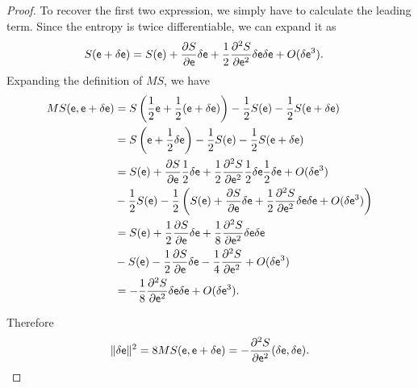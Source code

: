 \begin{proof}
	To recover the first two expression, we simply have to calculate the leading term. Since the entropy is twice differentiable, we can expand it as
\begin{equation}
	\begin{aligned}
		S(\mathsf{e} + \delta \mathsf{e}) &= S(\mathsf{e}) + \frac{\partial S}{\partial \mathsf{e}} \delta \mathsf{e} + \frac{1}{2} \frac{\partial^2 S}{\partial \mathsf{e}^2} \delta \mathsf{e} \delta \mathsf{e} + O(\delta \mathsf{e} ^3).
	\end{aligned}
\end{equation}
Expanding the definition of $MS$, we have
\begin{equation}
	\begin{aligned}
		MS(\mathsf{e}, \mathsf{e} + \delta \mathsf{e}) &= S\left(\frac{1}{2} \mathsf{e} + \frac{1}{2}(\mathsf{e} + \delta \mathsf{e}) \right) - \frac{1}{2} S(\mathsf{e}) - \frac{1}{2} S(\mathsf{e}+\delta \mathsf{e}) \\
		&=  S\left(\mathsf{e} + \frac{1}{2} \delta \mathsf{e} \right) - \frac{1}{2} S(\mathsf{e}) - \frac{1}{2} S(\mathsf{e}+\delta \mathsf{e}) \\
		&= S(\mathsf{e}) + \frac{\partial S}{\partial \mathsf{e}} \frac{1}{2}\delta \mathsf{e} + \frac{1}{2} \frac{\partial^2 S}{\partial \mathsf{e}^2} \frac{1}{2}\delta \mathsf{e} \frac{1}{2}\delta \mathsf{e} + O(\delta \mathsf{e} ^3) \\
		&- \frac{1}{2} S(\mathsf{e}) - \frac{1}{2} \left( S(\mathsf{e}) + \frac{\partial S}{\partial \mathsf{e}} \delta \mathsf{e} + \frac{1}{2} \frac{\partial^2 S}{\partial \mathsf{e}^2} \delta \mathsf{e} \delta \mathsf{e} + O(\delta \mathsf{e} ^3) \right) \\
		&= S(\mathsf{e}) + \frac{1}{2} \frac{\partial S}{\partial \mathsf{e}} \delta \mathsf{e} + \frac{1}{8} \frac{\partial^2 S}{\partial \mathsf{e}^2} \delta \mathsf{e} \delta \mathsf{e} \\
		&- S(\mathsf{e}) - \frac{1}{2} \frac{\partial S}{\partial \mathsf{e}} \delta \mathsf{e} - \frac{1}{4} \frac{\partial^2 S}{\partial \mathsf{e}^2} + O(\delta \mathsf{e} ^3) \\
		&= - \frac{1}{8} \frac{\partial^2 S}{\partial \mathsf{e}^2} \delta \mathsf{e} \delta \mathsf{e} + O(\delta \mathsf{e} ^3).
	\end{aligned}
\end{equation}

Therefore
$$ \lVert \delta \mathsf{e} \rVert^2 = 8 MS(\mathsf{e}, \mathsf{e} + \delta \mathsf{e}) = -  \frac{\partial^2 S}{\partial \mathsf{e}^2} (\delta \mathsf{e}, \delta \mathsf{e}).$$


\end{proof}
